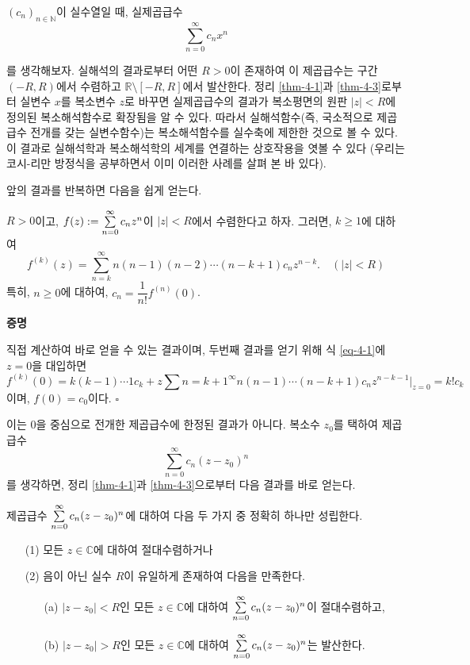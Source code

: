 \begin{salt_remark} \label{rem-4-1}
$(c_n)_{n\in\mathbb N}$이 실수열일 때,
실제곱급수
\[
\sum_{n=0}^\infty c_nx^n
\]
\end{salt_remark}
를 생각해보자. 실해석의 결과로부터 어떤 $R>0$이 존재하여
이 제곱급수는 구간 $(-R, R)$에서 수렴하고
$\mathbb R \setminus [-R,R]$에서 발산한다.
정리 \ref{thm-4-1}과 \ref{thm-4-3}로부터
실변수 $x$를 복소변수 $z$로 바꾸면 실제곱급수의 결과가 
복소평면의 원판 $|z|<R$에 정의된 복소해석함수로 확장됨을 알 수 있다.
따라서
실해석함수(즉, 국소적으로 제곱급수 전개를 갖는 실변수함수)는
복소해석함수를 실수축에 제한한 것으로 볼 수 있다.
이 결과로 실해석학과 복소해석학의 세계를 연결하는
상호작용을 엿볼 수 있다
(우리는 코시-리만 방정식을 공부하면서 이미 이러한 사례를 살펴 본 바 있다).

앞의 결과를 반복하면 다음을 쉽게 얻는다.

\begin{salt_corollary}\label{coro-4-1}
$R>0$이고, $f(z):= \sum\limits_{n=0}^\infty c_n z^n$이 $|z|<R$에서 수렴한다고 하자.
그러면, $k\ge1$에 대하여
\begin{equation}\label{eq-4-1}
f^{(k)}(z) = \sum_{n=k}^\infty n(n-1)(n-2)\cdots (n-k+1)c_nz^{n-k}.
\quad (|z|<R)
\end{equation}
특히, $n\ge0$에 대하여, $c_n = \dfrac1{n!} f^{(n)}(0)$.
\end{salt_corollary}

{\bf 증명}

직접 계산하여 바로 얻을 수 있는 결과이며, 두번째 결과를 얻기 위해
식 \eqref{eq-4-1}에 $z=0$을 대입하면
\[
f^{(k)}(0) = k(k-1)\cdots 1c_k + z \sum{n=k+1}^\infty n(n-1) \cdots (n-k+1)c_n z^{n-k-1}\Big|_{z=0}
= k!c_k
\]
이며, $f(0)=c_0$이다.
\hfill $\square$

이는 $0$을 중심으로 전개한 제곱급수에 한정된 결과가 아니다.
복소수 $z_0$를 택하여 제곱급수
\[
\sum_{n=0}^\infty c_n(z-z_0)^n
\]
를 생각하면, 정리 \ref{thm-4-1}과 \ref{thm-4-3}으로부터
다음 결과를 바로 얻는다.


\begin{salt_corollary} \label{thm-4-2}
제곱급수 $\sum\limits_{n=0}^\infty c_n(z-z_0)^n$에 대하여
다음 두 가지 중 정확히 하나만 성립한다.
\begin{itemize}
\item[(1)] 모든 $z\in\mathbb C$에 대하여 절대수렴하거나
\item[(2)] 음이 아닌 실수 $R$이 유일하게 존재하여 다음을 만족한다.
\begin{itemize}
\item[(a)] $|z-z_0|<R$인 모든 $z\in\mathbb C$에 대하여 
$\sum\limits_{n=0}^\infty c_n(z-z_0)^n$이 절대수렴하고,
\item[(b)] $|z-z_0|>R$인 모든 $z\in\mathbb C$에 대하여 
$\sum\limits_{n=0}^\infty c_n(z-z_0)^n$는 발산한다.
\end{itemize}
\end{itemize}
\end{salt_corollary}

